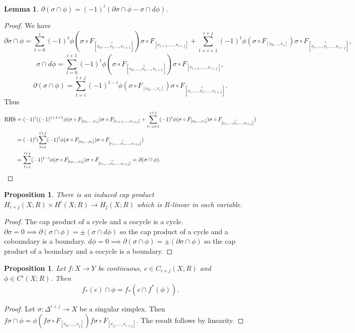 \documentclass{article}
\newtheorem{lemma}[theorem]{Lemma}
\newtheorem{proposition}[theorem]{Proposition}
\begin{document}
\begin{lemma}
$\partial(\sigma\cap\phi)=(-1)^i(\partial\sigma\cap\phi-\sigma\cap d\phi)$.
\end{lemma}
\begin{proof}
We have
\[\partial\sigma\cap\phi=\sum_{t=0}^i(-1)^t\phi(\sigma\circ F_{[e_0,...,\overset{\wedge}{e_t},..,e_{i+1}]})\sigma\circ F_{[e_{i+1},...,e_{i+j}]}+\sum_{t=i+1}^{i+j}(-1)^t\phi(\sigma\circ F_{[e_0,..,e_{i}]})\sigma\circ F_{[e_{i},...,\overset{\wedge}{e_t},...,e_{i+j}]},\]
\[\sigma\cap d\phi=\sum_{t=0}^{i+1}(-1)^t\phi(\sigma\circ F_{[e_0,...,\overset{\wedge}{e_t},..,e_{i+1}]})\sigma\circ F_{[e_{i+1},...,e_{i+j}]},\]
\[\partial(\sigma\cap\phi)=\sum_{t=i}^{i+j}(-1)^{t-i}\phi(\sigma\circ F_{[e_0,..,e_{i}]})\sigma\circ F_{[e_{i},...,\overset{\wedge}{e_t},...,e_{i+j}]}.\] Thus \begin{align*}\text{RHS}&=(-1)^i((-1)^{i+1+1}\phi(\sigma\circ F_{[e_0,...,e_i]})\sigma\circ F_{[e_{i+1},...,e_{i+j}]}+\sum_{t=i+1}^{i+j}(-1)^t\phi(\sigma\circ F_{[e_0,..,e_{i}]})\sigma\circ F_{[e_{i},...,\overset{\wedge}{e_t},...,e_{i+j}]})\\&=(-1)^i(\sum_{t=i}^{i+j}(-1)^t\phi(\sigma\circ F_{[e_0,..,e_{i}]})\sigma\circ F_{[e_{i},...,\overset{\wedge}{e_t},...,e_{i+j}]})\\&=\sum_{t=i}^{i+j}(-1)^{t-i}\phi(\sigma\circ F_{[e_0,..,e_{i}]})\sigma\circ F_{[e_{i},...,\overset{\wedge}{e_t},...,e_{i+j}]}=\partial(\sigma\cap\phi).\qedhere\end{align*}
\end{proof}

\begin{proposition}
There is an induced cap product $H_{i+j}(X;R)\times H^i(X;R)\to H_j(X;R)$ which is $R$-linear in each variable.
\end{proposition}
\begin{proof}
The cap product of a cycle and a cocycle is a cycle. $\partial\sigma=0\implies\partial(\sigma\cap\phi)=\pm(\sigma\cap d\phi)$ so the cap product of a cycle and a coboundary is a boundary. $d\phi=0\implies\partial(\sigma\cap\phi)=\pm(\partial\sigma\cap\phi)$ so the cap product of a boundary and a cocycle is a boundary.
\end{proof}

\begin{proposition}
Let $f\colon X\to Y$ be continuous, $c\in C_{i+j}(X;R)$ and $\phi\in C^i(X;R)$. Then \[f_*(c)\cap\phi=f_*(c\cap f^*(\phi)).\]
\end{proposition}
\begin{proof}
Let $\sigma\colon\Delta^{i+j}\to X$ be a singular simplex. Then $f\sigma\cap\phi=\phi(f\sigma\circ F_{[e_0,...,e_j]})f\sigma\circ F_{[e_j,...,e_{i+j}]}$.
The result follows by linearity.
\end{proof}
\end{document}
